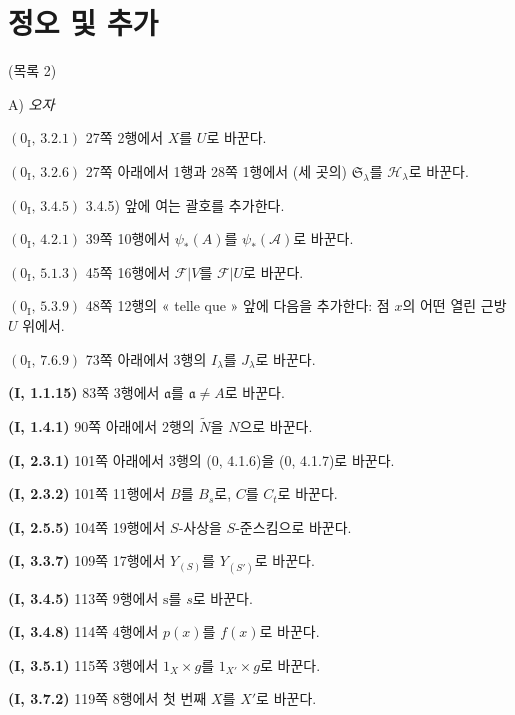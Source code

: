 \section*{정오 및 추가}
\begin{center}
(목록 2)

\medskip
A) \emph{오자}
\end{center}

\noindent\textbf{$(0_{\mathrm I},\,3.2.1)$} 27쪽 2행에서 $X$를 $U$로
바꾼다.

\noindent\textbf{$(0_{\mathrm I},\,3.2.6)$} 27쪽 아래에서 1행과 28쪽
1행에서 (세 곳의) $\mathfrak S_\lambda$를 $\mathscr H_\lambda$로
바꾼다.

\noindent\textbf{$(0_{\mathrm I},\,3.4.5)$} 3.4.5) 앞에 여는 괄호를
추가한다.

\noindent\textbf{$(0_{\mathrm I},\,4.2.1)$} 39쪽 10행에서
$\psi_*(A)$를 $\psi_*(\mathscr A)$로 바꾼다.

\noindent\textbf{$(0_{\mathrm I},\,5.1.3)$} 45쪽 16행에서
$\mathscr F|V$를 $\mathscr F|U$로 바꾼다.

\noindent\textbf{$(0_{\mathrm I},\,5.3.9)$} 48쪽 12행의
« telle que » 앞에 다음을 추가한다: 점 $x$의 어떤 열린 근방 $U$
위에서.

\noindent\textbf{$(0_{\mathrm I},\,7.6.9)$} 73쪽 아래에서 3행의
$I_\lambda$를 $J_\lambda$로 바꾼다.

\noindent\textbf{(I, 1.1.15)} 83쪽 3행에서 $\mathfrak a$를
$\mathfrak a\ne A$로 바꾼다.

\noindent\textbf{(I, 1.4.1)} 90쪽 아래에서 2행의 $\widetilde N$을
$N$으로 바꾼다.

\noindent\textbf{(I, 2.3.1)} 101쪽 아래에서 3행의 (0, 4.1.6)을
(0, 4.1.7)로 바꾼다.

\noindent\textbf{(I, 2.3.2)} 101쪽 11행에서 $B$를 $B_s$로, $C$를
$C_t$로 바꾼다.

\noindent\textbf{(I, 2.5.5)} 104쪽 19행에서 $S$-사상을
$S$-준스킴으로 바꾼다.

\noindent\textbf{(I, 3.3.7)} 109쪽 17행에서 $Y_{(S)}$를
$Y_{(S')}$로 바꾼다.

\noindent\textbf{(I, 3.4.5)} 113쪽 9행에서 $\mathrm s$를 $s$로
바꾼다.

\noindent\textbf{(I, 3.4.8)} 114쪽 4행에서 $p(x)$를 $f(x)$로
바꾼다.

\noindent\textbf{(I, 3.5.1)} 115쪽 3행에서 $1_X\times g$를
$1_{X'}\times g$로 바꾼다.

\noindent\textbf{(I, 3.7.2)} 119쪽 8행에서 첫 번째 $X$를 $X'$로
바꾼다.

